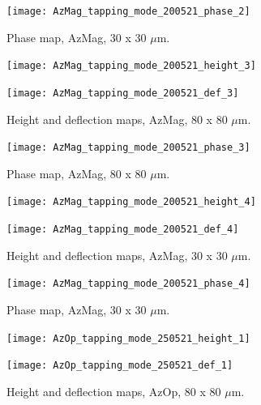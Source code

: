 \begin{figure}[H]
\centering
  \texttt{[image: AzMag\_tapping\_mode\_200521\_phase\_2]}
\caption[Phase map, AzMag]{Phase map, AzMag, 30 x 30 $\mu$m.}
\label{fig:afm_azmag_phase_7}
\end{figure}


\begin{figure}[H]
\centering
\begin{minipage}{.45\textwidth}
  \centering
  \texttt{[image: AzMag\_tapping\_mode\_200521\_height\_3]}
\end{minipage}
\begin{minipage}{.45\textwidth}
  \centering
  \texttt{[image: AzMag\_tapping\_mode\_200521\_def\_3]}
\end{minipage}
\caption[Height and deflection maps, AzMag]{Height and deflection maps, AzMag, 80 x 80 $\mu$m.}
\label{fig:afm_azmag_height_def_8}
\end{figure}

\begin{figure}[H]
\centering
  \texttt{[image: AzMag\_tapping\_mode\_200521\_phase\_3]}
\caption[Phase map, AzMag]{Phase map, AzMag, 80 x 80 $\mu$m.}
\label{fig:afm_azmag_phase_8}
\end{figure}


\begin{figure}[H]
\centering
\begin{minipage}{.45\textwidth}
  \centering
  \texttt{[image: AzMag\_tapping\_mode\_200521\_height\_4]}
\end{minipage}
\begin{minipage}{.45\textwidth}
  \centering
  \texttt{[image: AzMag\_tapping\_mode\_200521\_def\_4]}
\end{minipage}
\caption[Height and deflection maps, AzMag]{Height and deflection maps, AzMag, 30 x 30 $\mu$m.}
\label{fig:afm_azmag_height_def_9}
\end{figure}

\begin{figure}[H]
\centering
  \texttt{[image: AzMag\_tapping\_mode\_200521\_phase\_4]}
\caption[Phase map, AzMag]{Phase map, AzMag, 30 x 30 $\mu$m.}
\label{fig:afm_azmag_phase_9}
\end{figure}


\begin{figure}[H]
\centering
\begin{minipage}{.45\textwidth}
  \centering
  \texttt{[image: AzOp\_tapping\_mode\_250521\_height\_1]}
\end{minipage}
\begin{minipage}{.45\textwidth}
  \centering
  \texttt{[image: AzOp\_tapping\_mode\_250521\_def\_1]}
\end{minipage}
\caption[Height and deflection maps, AzOp]{Height and deflection maps, AzOp, 80 x 80 $\mu$m.}
\label{fig:afm_azop_height_def_1}
\end{figure}

